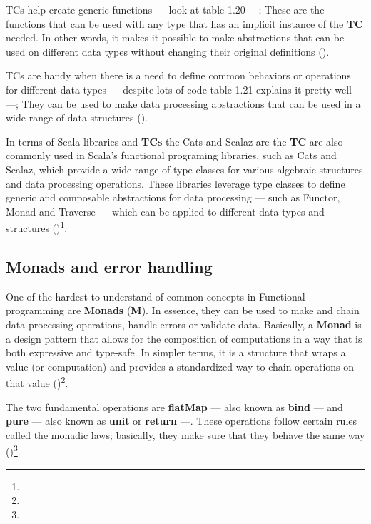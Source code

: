 

TCs help create generic functions — look at table 1.20 —; These are the functions that can be used with any type that has an implicit instance of the \textbf{TC} needed. In other words, it makes it possible to make abstractions that can be used on different data types without changing their original definitions (\cite{odersky.etal_2021})\footnotemark[2].



TCs are handy when there is a need to define common behaviors or operations for different data types — despite lots of code table 1.21 explains it pretty well —; They can be used to make data processing abstractions that can be used in a wide range of data structures (\cite{odersky.etal_2021})\footnotemark[2].



In terms of Scala libraries and \textbf{TCs} the Cats and Scalaz are the \textbf{TC} are also commonly used in Scala's functional programing libraries, such as Cats and Scalaz, which provide a wide range of type classes for various algebraic structures and data processing operations. These libraries leverage type classes to define generic and composable abstractions for data processing — such as Functor, Monad and Traverse — which can be applied to different data types and structures (\cite{odersky.etal_2021})\footnote[2]{}.

\subsection{Monads and error handling}

One of the hardest to understand of common concepts in Functional programming are \textbf{Monads} (\textbf{M}). In essence, they can be used to make and chain data processing operations, handle errors or validate data. Basically, a \textbf{Monad} is a design pattern that allows for the composition of computations in a way that is both expressive and type-safe. In simpler terms, it is a structure that wraps a value (or computation) and provides a standardized way to chain operations on that value
 (\cite{wadler1992monads})\footnote[15]{}.

The two fundamental operations are \textbf{flatMap} — also known as \textbf{bind} — and \textbf{pure} — also known as \textbf{unit} or \textbf{return} —. These operations follow certain rules called the monadic laws; basically, they make sure that they behave the same way (\cite{wadler1992monads})\footnote[15]{}.

